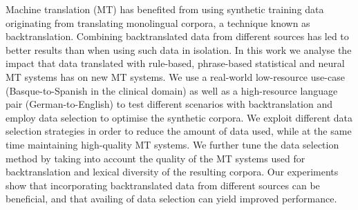 Machine translation (MT) has benefited from using synthetic training data originating from translating monolingual corpora, a technique known as backtranslation. Combining backtranslated data from different sources has led to better results than when using such data in isolation. In this work we analyse the impact that data translated with rule-based, phrase-based statistical and neural MT systems has on new MT systems. We use a real-world low-resource use-case (Basque-to-Spanish in the clinical domain) as well as a high-resource language pair (German-to-English) to test different scenarios with backtranslation and employ data selection to optimise the synthetic corpora. We exploit different data selection strategies in order to reduce the amount of data used, while at the same time maintaining high-quality MT systems. We further tune the data selection method by taking into account the quality of the MT systems used for backtranslation and lexical diversity of the resulting corpora. Our experiments show that incorporating backtranslated data from different sources can be beneficial, and that availing of data selection can yield improved performance.
